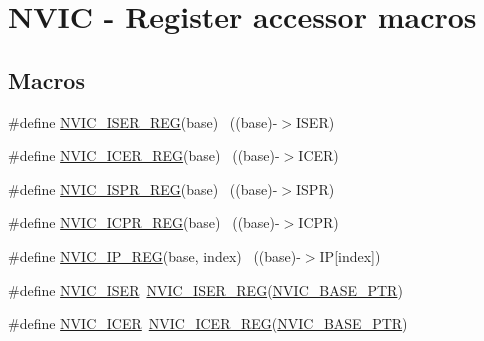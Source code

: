 \hypertarget{group___n_v_i_c___register___accessor___macros}{}\section{N\+V\+IC -\/ Register accessor macros}
\label{group___n_v_i_c___register___accessor___macros}
\subsection*{Macros}
\begin{DoxyCompactItemize}
\item 
\#define \hyperlink{group___n_v_i_c___register___accessor___macros_gadae5c656372b79c05561b75a5dee27f4}{N\+V\+I\+C\+\_\+\+I\+S\+E\+R\+\_\+\+R\+EG}(base)                                        ~((base)-\/$>$I\+S\+ER)
\item 
\#define \hyperlink{group___n_v_i_c___register___accessor___macros_gab9589754272d54d3d5c8f5c6d73da426}{N\+V\+I\+C\+\_\+\+I\+C\+E\+R\+\_\+\+R\+EG}(base)                                        ~((base)-\/$>$I\+C\+ER)
\item 
\#define \hyperlink{group___n_v_i_c___register___accessor___macros_gafe718485cb95307e1542f605b7b0b706}{N\+V\+I\+C\+\_\+\+I\+S\+P\+R\+\_\+\+R\+EG}(base)                                        ~((base)-\/$>$I\+S\+PR)
\item 
\#define \hyperlink{group___n_v_i_c___register___accessor___macros_ga8854a65e44c962adc43ed92d019916ac}{N\+V\+I\+C\+\_\+\+I\+C\+P\+R\+\_\+\+R\+EG}(base)                                        ~((base)-\/$>$I\+C\+PR)
\item 
\#define \hyperlink{group___n_v_i_c___register___accessor___macros_gac7b3df65f95ff3ad60a655db439a45a2}{N\+V\+I\+C\+\_\+\+I\+P\+\_\+\+R\+EG}(base,  index)                                ~((base)-\/$>$IP\mbox{[}index\mbox{]})
\item 
\#define \hyperlink{group___n_v_i_c___register___accessor___macros_ga92dfdc731185ed7507e681aa6f7d3f7e}{N\+V\+I\+C\+\_\+\+I\+S\+ER}~\hyperlink{group___n_v_i_c___register___accessor___macros_gadae5c656372b79c05561b75a5dee27f4}{N\+V\+I\+C\+\_\+\+I\+S\+E\+R\+\_\+\+R\+EG}(\hyperlink{group___n_v_i_c___peripheral_ga28f0a055d0c218e16d1fc7b13ff0caa5}{N\+V\+I\+C\+\_\+\+B\+A\+S\+E\+\_\+\+P\+TR})
\item 
\#define \hyperlink{group___n_v_i_c___register___accessor___macros_gaac08461a730870d217b9b5780d3dbf87}{N\+V\+I\+C\+\_\+\+I\+C\+ER}~\hyperlink{group___n_v_i_c___register___accessor___macros_gab9589754272d54d3d5c8f5c6d73da426}{N\+V\+I\+C\+\_\+\+I\+C\+E\+R\+\_\+\+R\+EG}(\hyperlink{group___n_v_i_c___peripheral_ga28f0a055d0c218e16d1fc7b13ff0caa5}{N\+V\+I\+C\+\_\+\+B\+A\+S\+E\+\_\+\+P\+TR})

\end{DoxyCompactItemize}
